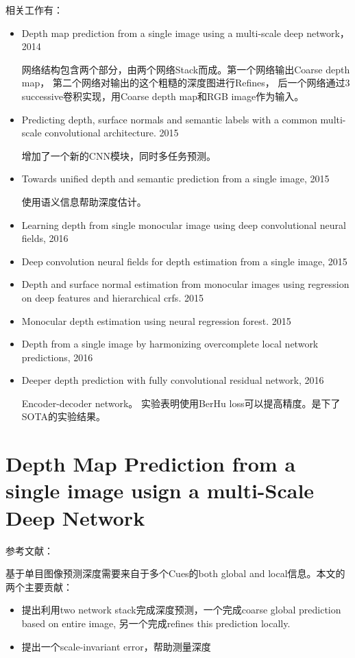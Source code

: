 相关工作有：
\begin{itemize}
\item Depth map prediction from a single image using a multi-scale deep network， 2014

网络结构包含两个部分，由两个网络Stack而成。第一个网络输出Coarse depth map， 第二个网络对输出的这个粗糙的深度图进行Refines， 后一个网络通过3 successive卷积实现，用Coarse depth map和RGB image作为输入。

\item Predicting depth, surface normals and semantic labels with a common multi-scale convolutional architecture. 2015

增加了一个新的CNN模块，同时多任务预测。

\item Towards unified depth and semantic prediction from a single image, 2015

使用语义信息帮助深度估计。

\item Learning depth from single monocular image using deep convolutional neural fields, 2016

\item Deep convolution neural fields for depth estimation from a single image, 2015

\item Depth and surface normal estimation from monocular images using regression on deep features and hierarchical crfs. 2015

\item Monocular depth estimation using neural regression forest. 2015

\item Depth from a single image by harmonizing overcomplete local network predictions, 2016

\item Deeper depth prediction with fully convolutional residual network, 2016

Encoder-decoder network。 实验表明使用BerHu loss可以提高精度。是下了SOTA的实验结果。

\end{itemize}


\section{Depth Map Prediction from a single image usign a multi-Scale Deep Network}

参考文献：

基于单目图像预测深度需要来自于多个Cues的both global and local信息。本文的两个主要贡献：
\begin{itemize}
\item 提出利用two network stack完成深度预测，一个完成coarse global prediction based on entire image, 另一个完成refines this prediction locally.
\item 提出一个scale-invariant error，帮助测量深度
\end{itemize}


